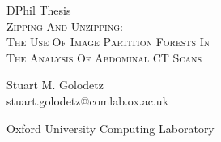 \begin{titlepage}

\begin{center}

\vspace*{7.5cm}

\normalsize DPhil Thesis\\
\LARGE \textsc{Zipping And Unzipping:\\The Use Of Image Partition Forests In\\The Analysis Of Abdominal CT Scans}\\

\vspace{2mm}


\vspace{-5mm}

\large Stuart M. Golodetz\\
\small stuart.golodetz@comlab.ox.ac.uk\\

\vspace{2mm}

\small Oxford University Computing Laboratory

\end{center}

\end{titlepage}
